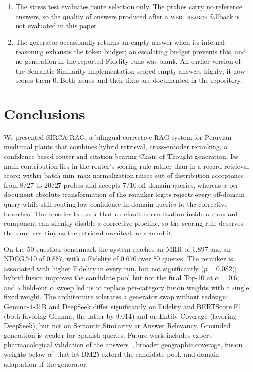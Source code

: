 \documentclass[runningheads]{llncs}
\newcommand{\sirca}{\textsc{SIRCA-RAG}}
\begin{document}
\begin{enumerate}[label=(\roman*),ref=\roman*,leftmargin=*,itemsep=1pt,topsep=2pt]
  \item \label{lim:websearch} The stress test evaluates route selection only. The probes carry no reference answers, so the quality of answers produced after a \textsc{web\_search} fallback is not evaluated in this paper.
  \item \label{lim:engineering} The generator occasionally returns an empty answer when its internal reasoning exhausts the token budget; an escalating budget prevents this, and no generation in the reported Fidelity runs was blank. An earlier version of the Semantic Similarity implementation scored empty answers highly; it now scores them $0$. Both issues and their fixes are documented in the repository.
\end{enumerate}

\section{Conclusions}
\label{sec:conclusion}

We presented \sirca{}, a bilingual corrective RAG system for Peruvian medicinal plants that combines hybrid retrieval, cross-encoder reranking, a confidence-based router and citation-bearing Chain-of-Thought generation. Its main contribution lies in the router's scoring rule rather than in a record retrieval score: within-batch min--max normalization raises out-of-distribution acceptance from $8/27$ to $20/27$ probes and accepts $7/10$ off-domain queries, whereas a per-document absolute transformation of the reranker logits rejects every off-domain query while still routing low-confidence in-domain queries to the corrective branches. The broader lesson is that a default normalization inside a standard component can silently disable a corrective pipeline, so the scoring rule deserves the same scrutiny as the retrieval architecture around it.

On the 50-question benchmark the system reaches an MRR of $0.897$ and an NDCG@10 of $0.887$, with a Fidelity of $0.670$ over 80 queries. The reranker is associated with higher Fidelity in every run, but not significantly ($p{=}0.082$); hybrid fusion improves the candidate pool but not the final Top-10 at $\alpha{=}0.6$; and a held-out $\alpha$ sweep led us to replace per-category fusion weights with a single fixed weight. The architecture tolerates a generator swap without redesign: Gemma-4-31B and DeepSeek differ significantly on Fidelity and BERTScore F1 (both favoring Gemma, the latter by $0.014$) and on Entity Coverage (favoring DeepSeek), but not on Semantic Similarity or Answer Relevancy. Grounded generation is weaker for Spanish queries. Future work includes expert pharmacological validation of the answers~\cite{heinrich2020ethnopharmacology}, broader geographic coverage, fusion weights below $\alpha^\ast$ that let BM25 extend the candidate pool, and domain adaptation of the generator.



\end{document}
